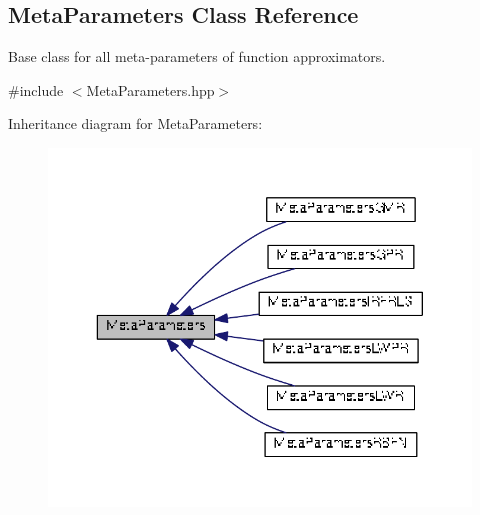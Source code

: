 \hypertarget{classDmpBbo_1_1MetaParameters}{\subsection{Meta\+Parameters Class Reference}
\label{classDmpBbo_1_1MetaParameters}
}


Base class for all meta-\/parameters of function approximators.  




{\ttfamily \#include $<$Meta\+Parameters.\+hpp$>$}



Inheritance diagram for Meta\+Parameters\+:
\nopagebreak
\begin{figure}[H]
\begin{center}
\leavevmode
\includegraphics[width=343pt]{classDmpBbo_1_1MetaParameters__inherit__graph}
\end{center}
\end{figure}
